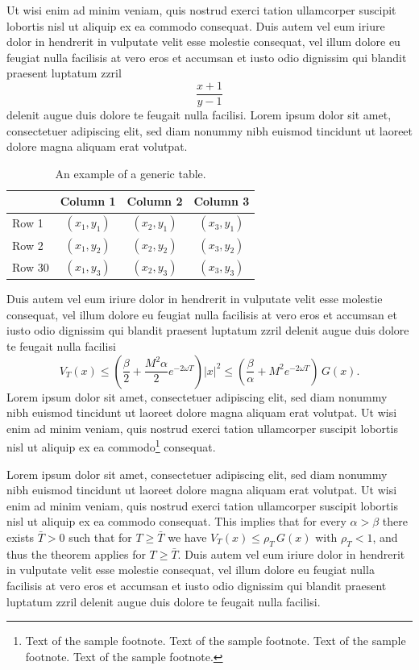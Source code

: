 \documentclass[oldfontcommands,6x9]{pupbook}
\begin{document}
Ut wisi enim ad minim veniam, quis nostrud exerci tation ullamcorper
suscipit lobortis nisl ut aliquip ex ea commodo consequat. Duis autem
vel eum iriure dolor in hendrerit in vulputate velit esse molestie
consequat, vel illum dolore eu feugiat nulla facilisis at vero eros et
accumsan et iusto odio dignissim qui blandit praesent luptatum zzril
\begin{equation}
\frac{x+1}{y-1}
\end{equation}
delenit augue duis dolore te feugait nulla facilisi. Lorem ipsum dolor
sit amet, consectetuer adipiscing elit, sed diam nonummy nibh euismod
tincidunt ut laoreet dolore magna aliquam erat volutpat. 

\begin{table}
\renewcommand{\arraystretch}{1.5}
\caption{An example of a generic table.}
\begin{tabular*}{27.5pc}{@{\extracolsep\fill}lccc@{}}\hline
 & Column 1 & Column 2 & Column 3\\\hline
Row 1 & $(x_1,y_1)$ & $(x_2,y_1)$ & $(x_3,y_1)$\\
Row 2 &$(x_1,y_2)$ & $(x_2,y_2)$& $(x_3,y_2)$\\
Row 30 & $(x_1,y_3)$& $(x_2,y_3)$& $(x_3,y_3)$\\\hline
\end{tabular*}
\end{table}
Duis autem vel eum iriure dolor in hendrerit in vulputate velit esse
molestie consequat, vel illum dolore eu feugiat nulla facilisis at vero
eros et accumsan et iusto odio dignissim qui blandit praesent luptatum
zzril delenit augue duis dolore te feugait nulla facilisi 
\[V_T(x) \le \left(\frac{\beta}{2} + \frac{M^2\alpha}{2}e^{-2\omega T} \right)|x|^2
\le \left(\frac{\beta}{\alpha}+M^2e^{-2\omega T}\right)\,G(x).\] Lorem ipsum
dolor sit amet, consectetuer adipiscing elit, sed diam nonummy nibh
euismod tincidunt ut laoreet dolore magna aliquam erat volutpat. Ut wisi
enim ad minim veniam, quis nostrud exerci tation ullamcorper suscipit
lobortis nisl ut aliquip ex ea commodo\footnote{Text of the sample footnote. 
Text of the sample footnote. 
Text of the sample footnote. 
Text of the sample footnote. } consequat. 

Lorem ipsum dolor sit amet, consectetuer adipiscing elit, sed diam
nonummy nibh euismod tincidunt ut laoreet dolore magna aliquam erat
volutpat. Ut wisi enim ad minim veniam, quis nostrud exerci tation
ullamcorper suscipit lobortis nisl ut aliquip ex ea commodo consequat.
This implies that for every $\alpha > \beta$
there exists ${\bar T}>0$ such that for $T \ge \bar{T}$ we have
$V_T(x) \le \rho_T\,G(x)$ with $\rho_T < 1$, and thus the theorem
applies for $T \ge \bar{T}$.
Duis autem vel eum iriure dolor in hendrerit in vulputate velit esse
molestie consequat, vel illum dolore eu feugiat nulla facilisis at vero
eros et accumsan et iusto odio dignissim qui blandit praesent luptatum
zzril delenit augue duis dolore te feugait nulla facilisi. 
\end{document}
